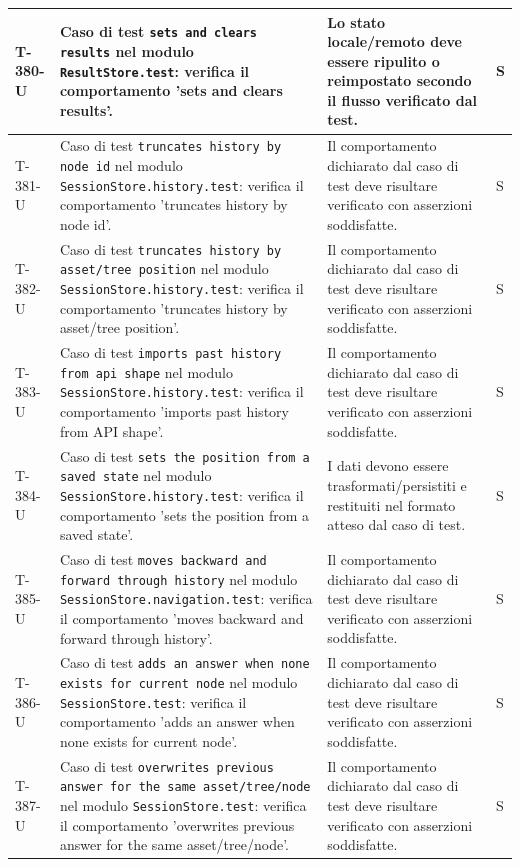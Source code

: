 \documentclass[a4paper,12pt]{article}
\begin{document}
{{\begin{longtable}{|>{\RaggedRight\arraybackslash}p{1.55cm}|>{\RaggedRight\arraybackslash}p{8.0cm}|>{\RaggedRight\arraybackslash}p{4.6cm}|>{\RaggedRight\arraybackslash}p{1.2cm}|}
        \hline
        T-380-U & Caso di test \texttt{sets and clears results} nel modulo \texttt{ResultStore.test}: verifica il comportamento 'sets and clears results'. & Lo stato locale/remoto deve essere ripulito o reimpostato secondo il flusso verificato dal test. & S \\
        \hline
        T-381-U & Caso di test \texttt{truncates history by node id} nel modulo \texttt{SessionStore.history.test}: verifica il comportamento 'truncates history by node id'. & Il comportamento dichiarato dal caso di test deve risultare verificato con asserzioni soddisfatte. & S \\
        \hline
        T-382-U & Caso di test \texttt{truncates history by asset/tree position} nel modulo \texttt{SessionStore.history.test}: verifica il comportamento 'truncates history by asset/tree position'. & Il comportamento dichiarato dal caso di test deve risultare verificato con asserzioni soddisfatte. & S \\
        \hline
        T-383-U & Caso di test \texttt{imports past history from api shape} nel modulo \texttt{SessionStore.history.test}: verifica il comportamento 'imports past history from API shape'. & Il comportamento dichiarato dal caso di test deve risultare verificato con asserzioni soddisfatte. & S \\
        \hline
        T-384-U & Caso di test \texttt{sets the position from a saved state} nel modulo \texttt{SessionStore.history.test}: verifica il comportamento 'sets the position from a saved state'. & I dati devono essere trasformati/persistiti e restituiti nel formato atteso dal caso di test. & S \\
        \hline
        T-385-U & Caso di test \texttt{moves backward and forward through history} nel modulo \texttt{SessionStore.navigation.test}: verifica il comportamento 'moves backward and forward through history'. & Il comportamento dichiarato dal caso di test deve risultare verificato con asserzioni soddisfatte. & S \\
        \hline
        T-386-U & Caso di test \texttt{adds an answer when none exists for current node} nel modulo \texttt{SessionStore.test}: verifica il comportamento 'adds an answer when none exists for current node'. & Il comportamento dichiarato dal caso di test deve risultare verificato con asserzioni soddisfatte. & S \\
        \hline
        T-387-U & Caso di test \texttt{overwrites previous answer for the same asset/tree/node} nel modulo \texttt{SessionStore.test}: verifica il comportamento 'overwrites previous answer for the same asset/tree/node'. & Il comportamento dichiarato dal caso di test deve risultare verificato con asserzioni soddisfatte. & S \\

\end{longtable}}}
\end{document}
